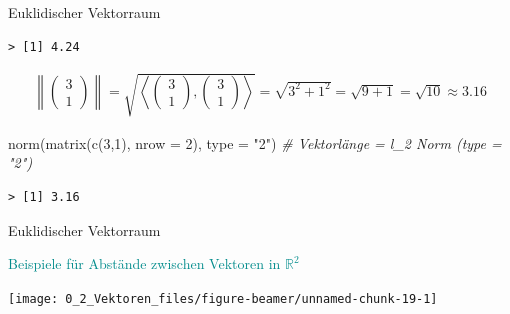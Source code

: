 \documentclass[
  8pt,
  ignorenonframetext,
]{beamer}
\newenvironment{Shaded}{\begin{snugshade}}{\end{snugshade}}
\newcommand{\AttributeTok}[1]{\textcolor[rgb]{0.77,0.63,0.00}{#1}}
\newcommand{\CommentTok}[1]{\textcolor[rgb]{0.56,0.35,0.01}{\textit{#1}}}
\newcommand{\DecValTok}[1]{\textcolor[rgb]{0.00,0.00,0.81}{#1}}
\newcommand{\FunctionTok}[1]{\textcolor[rgb]{0.00,0.00,0.00}{#1}}
\newcommand{\NormalTok}[1]{#1}
\newcommand{\StringTok}[1]{\textcolor[rgb]{0.31,0.60,0.02}{#1}}
\begin{document}
\begin{frame}[fragile]{Euklidischer Vektorraum}
\begin{verbatim}
> [1] 4.24
\end{verbatim}

\begin{align*}
\left\lVert \begin{pmatrix}3\\1\end{pmatrix}\right\rVert = \sqrt{\left\langle \begin{pmatrix}3\\1\end{pmatrix},\begin{pmatrix}3\\1\end{pmatrix} \right\rangle} = \sqrt{3^2+1^2} = \sqrt{9+1}
= \sqrt{10} \approx 3.16
\end{align*}

\begin{Shaded}
\begin{Highlighting}[]
\FunctionTok{norm}\NormalTok{(}\FunctionTok{matrix}\NormalTok{(}\FunctionTok{c}\NormalTok{(}\DecValTok{3}\NormalTok{,}\DecValTok{1}\NormalTok{), }\AttributeTok{nrow =} \DecValTok{2}\NormalTok{), }\AttributeTok{type =} \StringTok{"2"}\NormalTok{)  }\CommentTok{\# Vektorlänge = l\_2 Norm (type = "2")}
\end{Highlighting}
\end{Shaded}

\begin{verbatim}
> [1] 3.16
\end{verbatim}
\end{frame}

\begin{frame}{Euklidischer Vektorraum}
\protect\hypertarget{euklidischer-vektorraum-6}{}
\vspace{3mm}

\textcolor{darkcyan}{Beispiele für Abstände zwischen Vektoren in $\mathbb{R}^2$}
\vspace{9pt}

\begin{center}\texttt{[image: 0\_2\_Vektoren\_files/figure-beamer/unnamed-chunk-19-1]} \end{center}
\end{frame}
\end{document}
